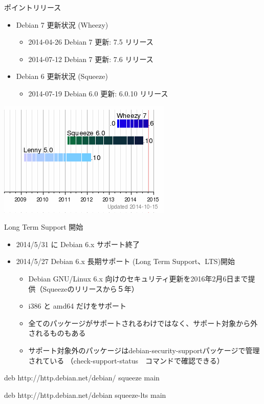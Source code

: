 
\begin{frame}{ポイントリリース}

\begin{itemize}
\item Debian 7 更新状況 (Wheezy)
\begin{itemize}
\item 2014-04-26 Debian 7 更新: 7.5 リリース
\item 2014-07-12 Debian 7 更新: 7.6 リリース
\end{itemize}
\item Debian 6 更新状況 (Squeeze)
\begin{itemize}
\item 2014-07-19 Debian 6.0 更新: 6.0.10 リリース
\end{itemize}
\end{itemize}

\begin{center}
\includegraphics[scale=0.7]{image201410/debian-release-201410-cut.png}
\end{center}

\end{frame}

\begin{frame}[containsverbatim]{Long Term Support 開始}
\begin{itemize}
\item 2014/5/31 に Debian 6.x サポート終了
\item 2014/5/27 Debian 6.x 長期サポート (Long Term Support、LTS)開始
\begin{itemize}
\item Debian GNU/Linux 6.x
向けのセキュリティ更新を2016年2月6日まで提供（Squeezeのリリースから５年）
\item i386 と amd64 だけをサポート
\item 全てのパッケージがサポートされるわけではなく、サポート対象から外されるものもある
\item サポート対象外のパッケージはdebian-security-supportパッケージで管理されている
（check-support-status　コマンドで確認できる）
\end{itemize}
\end{itemize}

\begin{commandline}
deb http://http.debian.net/debian/ squeeze main

deb http://http.debian.net/debian squeeze-lts main
\end{commandline}

\end{frame}

